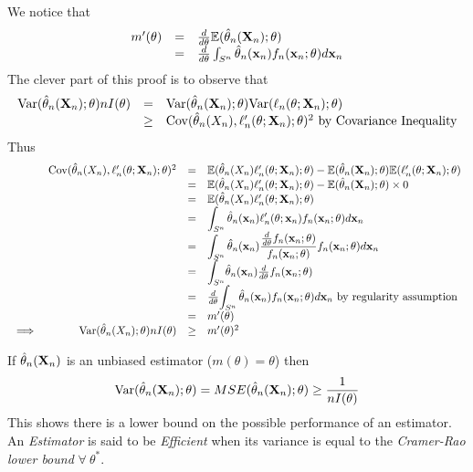 \documentclass[11pt,a4paper]{article}
\begin{document}
We notice that
\[\begin{array}{rcl}
m'(\theta)&=&\frac{d}{d\theta}\mathbb{E}(\hat{\theta}_n(\textbf{X}_n);\theta)\\
&=&\frac{d}{d\theta}\int_{S^n}\hat{\theta}_n(\textbf{x}_n)f_n(\textbf{x}_n;\theta)d\textbf{x}_n
\end{array}\]
The clever part of this proof is to observe that
\[\begin{array}{rcl}
\mathrm{Var}(\hat{\theta}_n(\textbf{X}_n);\theta)nI(\theta)&=&\mathrm{Var}(\hat{\theta}_n(\textbf{X}_n);\theta)\mathrm{Var}(\ell_n(\theta;\textbf{X}_n);\theta)\\
&\geq&\mathrm{Cov}(\hat{\theta}_n(X_n),\ell'_n(\theta;\textbf{X}_n);\theta)^2\text{ by Covariance Inequality}
\end{array}\]
Thus
\[\begin{array}{rrcl}
&\mathrm{Cov}(\hat{\theta}_n(X_n),\ell'_n(\theta;\textbf{X}_n);\theta)^2&=&\mathbb{E}(\hat{\theta}_n(X_n)\ell_n'(\theta;\textbf{X}_n);\theta)-\mathbb{E}(\hat{\theta}_n(\textbf{X}_n);\theta)\mathbb{E}(\ell'_n(\theta;\textbf{X}_n);\theta)\\
&&=&\mathbb{E}(\hat{\theta}_n(X_n)\ell_n'(\theta;\textbf{X}_n);\theta)-\mathbb{E}(\hat{\theta}_n(\textbf{X}_n);\theta)\times0\\
&&=&\mathbb{E}(\hat{\theta}_n(X_n)\ell_n'(\theta;\textbf{X}_n);\theta)\\
&&=&{\displaystyle\int_{S^n}\hat{\theta}_n(\textbf{x}_n)\ell'_n(\theta;\textbf{x}_n)f_n(\textbf{x}_n;\theta)d\textbf{x}_n}\\
&&=&{\displaystyle\int_{S^n}\hat{\theta}_n(\textbf{x}_n)\frac{\frac{d}{d\theta}f_n(\textbf{x}_n;\theta)}{f_n(\textbf{x}_n;\theta)}f_n(\textbf{x}_n;\theta)d\textbf{x}_n}\\
&&=&{\displaystyle\int_{S^n}}\hat{\theta}_n(\textbf{x}_n)\frac{d}{d\theta}f_n(\textbf{x}_n;\theta)\\
&&=&\frac{d}{d\theta}{\displaystyle\int_{S^n}\hat{\theta}_n(\textbf{x}_n)f_n(\textbf{x}_n;\theta)d\textbf{x}_n}\text{ by regularity assumption}\\
&&=&m'(\theta)\\
\implies&\mathrm{Var}(\hat{\theta}_n(X_n);\theta)nI(\theta)&\geq&m'(\theta)^2
\end{array}\]

If $\hat{\theta}_n(\textbf{X}_n)$ is an unbiased estimator (\ie $m(\theta)=\theta$) then
$$\mathrm{Var}(\hat{\theta}_n(\textbf{X}_n);\theta)=MSE(\hat{\theta}_n(\textbf{X}_n);\theta)\geq\frac{1}{nI(\theta)}$$
This shows there is a lower bound on the possible performance of an estimator.\\

An \textit{Estimator} is said to be \textit{Efficient} when its variance is equal to the \textit{Cramer-Rao lower bound} $\forall\ \theta^*$.\\
\end{document}

